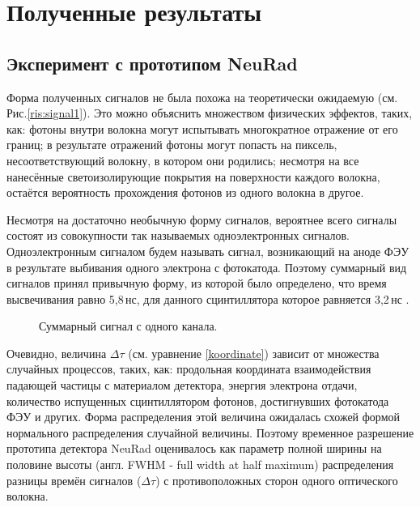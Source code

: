 \section{Полученные результаты}
\subsection{Эксперимент с прототипом NeuRad}
\label{NeuRadres}

Форма полученных сигналов не была похожа на теоретически ожидаемую (см. Рис.\ref{ris:signal1}). Это можно объяснить множеством физических эффектов, таких, как: фотоны внутри волокна могут испытывать многократное отражение от его границ; в результате отражений фотоны могут попасть на пиксель, несоответствующий волокну, в котором они родились; несмотря на все нанесённые светоизолирующие покрытия на поверхности каждого волокна, остаётся вероятность прохождения фотонов из одного волокна в другое.

Несмотря на достаточно необычную форму сигналов, вероятнее всего сигналы состоят из совокупности так называемых одноэлектронных сигналов. Одноэлектронным сигналом будем называть сигнал, возникающий на аноде ФЭУ в результате выбивания одного электрона с фотокатода. Поэтому суммарный вид сигналов принял привычную форму, из которой было определено, что время высвечивания равно 5,8\,нс, для данного сцинтиллятора которое равняется 3,2\,нс \cite{crystals}.

\begin{figure}[h]
	\caption{Суммарный сигнал с одного канала.}
	\label{ris:integralform}
\end{figure}

Очевидно, величина $\Delta\tau$ (см. уравнение \eqref{koordinate}) зависит от множества случайных процессов, таких, как: продольная координата взаимодействия падающей частицы с материалом детектора, энергия электрона отдачи, количество испущенных сцинтиллятором фотонов, достигнувших фотокатода ФЭУ и других. Форма распределения этой величина ожидалась схожей формой нормального распределения случайной величины. Поэтому временное разрешение прототипа детектора NeuRad оценивалось как параметр полной ширины на половине высоты (англ. FWHM - full width at half maximum) распределения разницы времён сигналов ($\Delta\tau$) с противоположных сторон одного оптического волокна.

